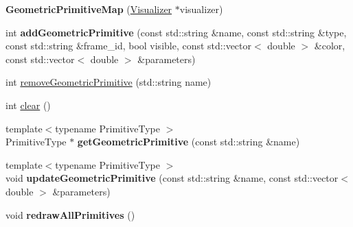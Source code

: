 \begin{DoxyCompactItemize}
\item 
\hypertarget{classhiqp_1_1geometric__primitives_1_1GeometricPrimitiveMap_ae59d213ebfa9f3d22678e048928cf565}{{\bfseries Geometric\-Primitive\-Map} (\hyperlink{classhiqp_1_1Visualizer}{Visualizer} $\ast$visualizer)}\label{classhiqp_1_1geometric__primitives_1_1GeometricPrimitiveMap_ae59d213ebfa9f3d22678e048928cf565}

\item 
\hypertarget{classhiqp_1_1geometric__primitives_1_1GeometricPrimitiveMap_a6ddc5d3b4e8e44748fbb0c9e66957952}{int {\bfseries add\-Geometric\-Primitive} (const std\-::string \&name, const std\-::string \&type, const std\-::string \&frame\-\_\-id, bool visible, const std\-::vector$<$ double $>$ \&color, const std\-::vector$<$ double $>$ \&parameters)}\label{classhiqp_1_1geometric__primitives_1_1GeometricPrimitiveMap_a6ddc5d3b4e8e44748fbb0c9e66957952}

\item 
int \hyperlink{classhiqp_1_1geometric__primitives_1_1GeometricPrimitiveMap_a07d04c1a3bb164bb501bd03cc6bc1eae}{remove\-Geometric\-Primitive} (std\-::string name)
\item 
int \hyperlink{classhiqp_1_1geometric__primitives_1_1GeometricPrimitiveMap_aed92b78b51ccd075d226b003f9576476}{clear} ()
\item 
\hypertarget{classhiqp_1_1geometric__primitives_1_1GeometricPrimitiveMap_a51ccc8c0ff1434c8b8d1bcc2d0d9bbbf}{{\footnotesize template$<$typename Primitive\-Type $>$ }\\Primitive\-Type $\ast$ {\bfseries get\-Geometric\-Primitive} (const std\-::string \&name)}\label{classhiqp_1_1geometric__primitives_1_1GeometricPrimitiveMap_a51ccc8c0ff1434c8b8d1bcc2d0d9bbbf}

\item 
\hypertarget{classhiqp_1_1geometric__primitives_1_1GeometricPrimitiveMap_a844d0776ad4465b25825d91d2eb1f38a}{{\footnotesize template$<$typename Primitive\-Type $>$ }\\void {\bfseries update\-Geometric\-Primitive} (const std\-::string \&name, const std\-::vector$<$ double $>$ \&parameters)}\label{classhiqp_1_1geometric__primitives_1_1GeometricPrimitiveMap_a844d0776ad4465b25825d91d2eb1f38a}

\item 
\hypertarget{classhiqp_1_1geometric__primitives_1_1GeometricPrimitiveMap_a401b6481e8e08e26466dbd06c8b62ee5}{void {\bfseries redraw\-All\-Primitives} ()}\label{classhiqp_1_1geometric__primitives_1_1GeometricPrimitiveMap_a401b6481e8e08e26466dbd06c8b62ee5}


\end{DoxyCompactItemize}
